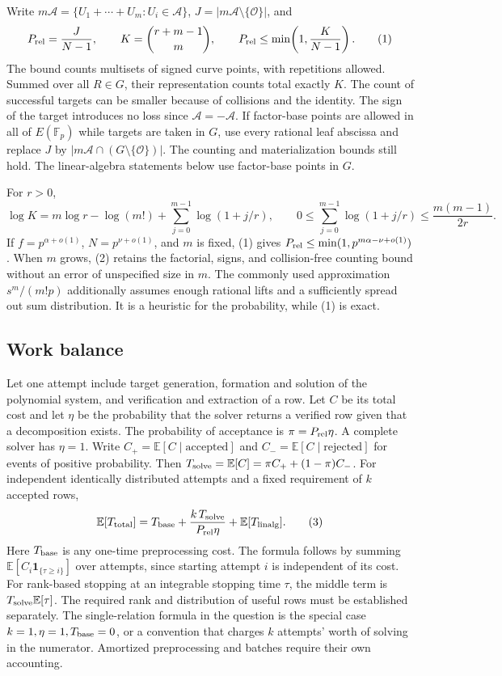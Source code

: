 \documentclass[11pt]{article}
\newcommand{\Fp}{\mathbb F_p}
\newcommand{\OO}{\mathcal O}
\newcommand{\A}{\mathcal A}
\newcommand{\EE}{\mathbb E}
\begin{document}
Write \(m\A=\{U_1+\cdots+U_m:U_i\in\A\}\), \(J=|m\A\setminus\{\OO\}|\), and
\[
P_{\rm rel}=\frac{J}{N-1},\qquad
K=\binom{r+m-1}{m},\qquad
P_{\rm rel}\le \min\!\left(1,\frac{K}{N-1}\right).
\tag{1}
\]
The bound counts multisets of signed curve points, with repetitions allowed. Summed over all \(R\in G\), their representation counts total exactly \(K\). The count of successful targets can be smaller because of collisions and the identity. The sign of the target introduces no loss since \(\A=-\A\). If factor-base points are allowed in all of \(E(\Fp)\) while targets are taken in \(G\), use every rational leaf abscissa and replace \(J\) by \(|m\A\cap(G\setminus\{\OO\})|\). The counting and materialization bounds still hold. The linear-algebra statements below use factor-base points in \(G\).

For \(r>0\),
\[
\log K=m\log r-\log(m!)
          +\sum_{j=0}^{m-1}\log(1+j/r),
\qquad
0\le\sum_{j=0}^{m-1}\log(1+j/r)\le \frac{m(m-1)}{2r}.
\tag{2}
\]
If \(f=p^{\alpha+o(1)}\), \(N=p^{\nu+o(1)}\), and \(m\) is fixed, (1) gives \(P_{\rm rel}\le\min(1,p^{m\alpha-\nu+o(1)})\). When \(m\) grows, (2) retains the factorial, signs, and collision-free counting bound without an error of unspecified size in \(m\). The commonly used approximation \(s^m/(m!p)\) additionally assumes enough rational lifts and a sufficiently spread out sum distribution. It is a heuristic for the probability, while (1) is exact.

\subsection*{Work balance}

Let one attempt include target generation, formation and solution of the polynomial system, and verification and extraction of a row. Let \(C\) be its total cost and let \(\eta\) be the probability that the solver returns a verified row given that a decomposition exists. The probability of acceptance is \(\pi=P_{\rm rel}\eta\). A complete solver has \(\eta=1\). Write \(C_+=\EE[C\mid\text{accepted}]\) and \(C_-=\EE[C\mid\text{rejected}]\) for events of positive probability. Then \(T_{\rm solve}=\EE[C]=\pi C_++(1-\pi)C_-\). For independent identically distributed attempts and a fixed requirement of \(k\) accepted rows,
\[
\EE[T_{\rm total}]
 =T_{\rm base}+\frac{k\,T_{\rm solve}}{P_{\rm rel}\eta}
   +\EE[T_{\rm linalg}].
\tag{3}
\]
Here \(T_{\rm base}\) is any one-time preprocessing cost. The formula follows by summing \(\EE[C_i\mathbf 1_{\{\tau\ge i\}}]\) over attempts, since starting attempt \(i\) is independent of its cost. For rank-based stopping at an integrable stopping time \(\tau\), the middle term is \(T_{\rm solve}\EE[\tau]\). The required rank and distribution of useful rows must be established separately. The single-relation formula in the question is the special case \(k=1,\eta=1,T_{\rm base}=0\), or a convention that charges \(k\) attempts' worth of solving in the numerator. Amortized preprocessing and batches require their own accounting.
\end{document}
